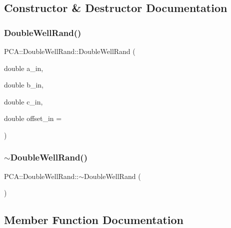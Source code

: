 \subsection{Constructor \& Destructor Documentation}
\hypertarget{class_p_c_a_1_1_double_well_rand_a5a804723b5487331965c41acfaed8f0a}{}\label{class_p_c_a_1_1_double_well_rand_a5a804723b5487331965c41acfaed8f0a} 
\subsubsection{\texorpdfstring{Double\+Well\+Rand()}{DoubleWellRand()}}
{\footnotesize\ttfamily P\+C\+A\+::\+Double\+Well\+Rand\+::\+Double\+Well\+Rand (\begin{DoxyParamCaption}\item[{double}]{a\+\_\+in,  }\item[{double}]{b\+\_\+in,  }\item[{double}]{c\+\_\+in,  }\item[{double}]{offset\+\_\+in = {} }\end{DoxyParamCaption})}

\hypertarget{class_p_c_a_1_1_double_well_rand_aafd6d9bf8587eda1cb46e45686cf772a}{}\label{class_p_c_a_1_1_double_well_rand_aafd6d9bf8587eda1cb46e45686cf772a} 
\subsubsection{\texorpdfstring{$\sim$\+Double\+Well\+Rand()}{~DoubleWellRand()}}
{\footnotesize\ttfamily P\+C\+A\+::\+Double\+Well\+Rand\+::$\sim$\+Double\+Well\+Rand (\begin{DoxyParamCaption}{ }\end{DoxyParamCaption})}



\subsection{Member Function Documentation}
\hypertarget{class_p_c_a_1_1_double_well_rand_a89905058cce9c8bbecd5a0dabd21ea3c}{}\label{class_p_c_a_1_1_double_well_rand_a89905058cce9c8bbecd5a0dabd21ea3c} 
